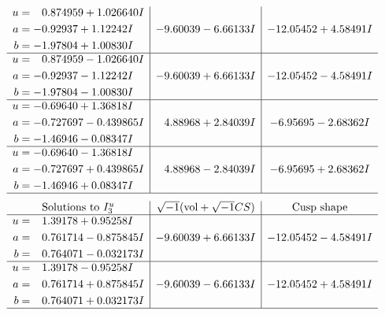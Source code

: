 \documentclass[1p]{elsarticle_modified}
\theoremstyle{definition}
\newcommand{\I}{\sqrt{-1}}
\begin{document}
$$\begin{array}{c|c|c}
\begin{aligned}
u &= \phantom{-}0.874959 + 1.026640 I \\
a &= -0.92937 + 1.12242 I \\
b &= -1.97804 + 1.00830 I\end{aligned}
 & -9.60039 - 6.66133 I & -12.05452 + 4.58491 I \\ \hline\begin{aligned}
u &= \phantom{-}0.874959 - 1.026640 I \\
a &= -0.92937 - 1.12242 I \\
b &= -1.97804 - 1.00830 I\end{aligned}
 & -9.60039 + 6.66133 I & -12.05452 - 4.58491 I \\ \hline\begin{aligned}
u &= -0.69640 + 1.36818 I \\
a &= -0.727697 - 0.439865 I \\
b &= -1.46946 - 0.08347 I\end{aligned}
 & \phantom{-}4.88968 + 2.84039 I & -6.95695 - 2.68362 I \\ \hline\begin{aligned}
u &= -0.69640 - 1.36818 I \\
a &= -0.727697 + 0.439865 I \\
b &= -1.46946 + 0.08347 I\end{aligned}
 & \phantom{-}4.88968 - 2.84039 I & -6.95695 + 2.68362 I\\
 \hline 
 \end{array}$$\newpage$$\begin{array}{c|c|c}  
\text{Solutions to }I^u_{3}& \I (\text{vol} + \sqrt{-1}CS) & \text{Cusp shape}\\
 \hline 
\begin{aligned}
u &= \phantom{-}1.39178 + 0.95258 I \\
a &= \phantom{-}0.761714 - 0.875845 I \\
b &= \phantom{-}0.764071 - 0.032173 I\end{aligned}
 & -9.60039 + 6.66133 I & -12.05452 - 4.58491 I \\ \hline\begin{aligned}
u &= \phantom{-}1.39178 - 0.95258 I \\
a &= \phantom{-}0.761714 + 0.875845 I \\
b &= \phantom{-}0.764071 + 0.032173 I\end{aligned}
 & -9.60039 - 6.66133 I & -12.05452 + 4.58491 I\\
 \hline 
 \end{array}$$\newpage\newpage\renewcommand{\arraystretch}{1}
\end{document}
